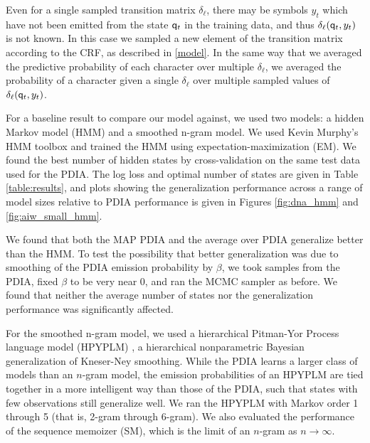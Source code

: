 Even for a single sampled transition matrix $\delta_\ell$, there may be symbols $y_t$ which have not been emitted from the state $\q_t$ in the training data, and thus $\delta_\ell(\q_t,y_t)$ is not known.  In this case we sampled a new element of the transition matrix according to the CRF, as described in \ref{model}.  In the same way that we averaged the predictive probability of each character over multiple $\delta_\ell$, we averaged the probability of a character given a single $\delta_\ell$ over multiple sampled values of $\delta_\ell(\q_t,y_t)$.

For a baseline result to compare our model against, we used two models: a hidden Markov model (HMM) and a smoothed n-gram model.  We used Kevin Murphy's HMM toolbox \cite{Murphy} and trained the HMM using expectation-maximization (EM).  We found the best number of hidden states by cross-validation on the same test data used for the PDIA.  The log loss and optimal number of states are given in Table \ref{table:results}, and plots showing the generalization performance across a range of model sizes relative to PDIA performance is given in Figures \ref{fig:dna_hmm} and \ref{fig:aiw_small_hmm}.  

We found that both the MAP PDIA and the average over PDIA generalize better than the HMM.  To test the possibility that better generalization was due to smoothing of the PDIA emission probability by $\beta$, we took samples from the PDIA, fixed $\beta$ to be very near 0, and ran the MCMC sampler as before.  We found that neither the average number of states nor the generalization performance was significantly affected.

For the smoothed n-gram model, we used a hierarchical Pitman-Yor Process language model (HPYPLM) \cite{Teh}, a hierarchical nonparametric Bayesian generalization of Kneser-Ney smoothing.  While the PDIA learns a larger class of models than an $n$-gram model, the emission probabilities of an HPYPLM are tied together in a more intelligent way than those of the PDIA, such that states with few observations still generalize well.  We ran the HPYPLM with Markov order 1 through 5 (that is, 2-gram through 6-gram).  We also evaluated the performance of the sequence memoizer (SM), which is the limit of an $n$-gram as $n\rightarrow\infty$.

